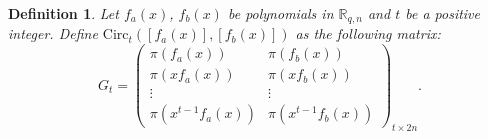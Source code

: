 \documentclass[journal]{IEEEtran}
\newtheorem{definition}{Definition}
\begin{document}
\begin{definition}
	Let $f_a(x)$, $f_b(x)$ be polynomials in $\mathbb{R}_{q,n}$ and $t$ be a positive integer. Define $\mathrm{Circ}_t\left( \left[f_a(x)\right],\left[f_b(x)\right] \right)$ as the following matrix:  
	\begin{equation}
		G_t =
		\left(\begin{array}{c|c}
		  \pi(f_a(x))           &  \pi(f_b(x))        \\
			
			\pi(xf_a(x))        & \pi(xf_b(x))        \\
			
			\vdots           & \vdots           \\
			
			\pi(x^{t-1} f_a(x)) & \pi(x^{t-1} f_b(x))
		\end{array}\right)_{t\times 2n}.
	\end{equation}%
\end{definition}
\end{document}
